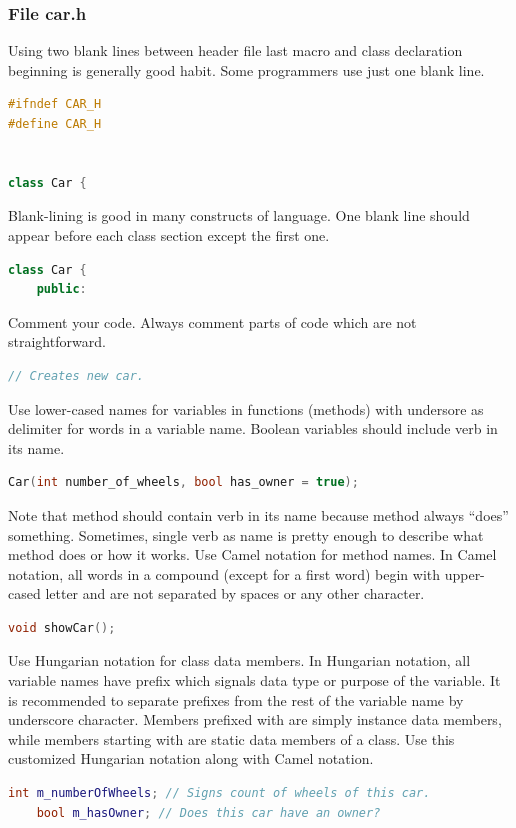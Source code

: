 \subsubsection*{File car.h}
Using two blank lines between header file last macro and class declaration beginning is generally good habit. Some programmers use just one blank line.
\begin{lstlisting}[firstnumber=1,language=cpp]
#ifndef CAR_H
#define CAR_H


class Car {
\end{lstlisting}
Blank-lining is good in many constructs of \cpp{} language. One blank line should appear before each class section except the first one.
\begin{lstlisting}[firstnumber=5,language=cpp]
class Car {
    public:
\end{lstlisting}
Comment your code. Always comment parts of code which are not straightforward.
\begin{lstlisting}[firstnumber=7,language=cpp]
	// Creates new car.
\end{lstlisting}
Use lower-cased names for variables in functions (methods) with undersore as delimiter for words in a variable name. Boolean variables should include verb in its name.
\begin{lstlisting}[firstnumber=8,language=cpp]
	Car(int number_of_wheels, bool has_owner = true);
\end{lstlisting}
Note that method should contain verb in its name because method always \enquote{does} something. Sometimes, single verb as name is pretty enough to describe what method does or how it works. Use Camel notation for method names. In Camel notation, all words in a compound (except for a first word) begin with upper-cased letter and are not separated by spaces or any other character.
\begin{lstlisting}[firstnumber=11,language=cpp]
	void showCar();
\end{lstlisting}
Use Hungarian notation for class data members. In Hungarian notation, all variable names have prefix which signals data type or purpose of the variable. It is recommended to separate prefixes from the rest of the variable name by underscore character. Members prefixed with are simply instance data members, while members starting with are static data members of a class. Use this customized Hungarian notation along with Camel notation.
\begin{lstlisting}[firstnumber=14,language=cpp]
	int m_numberOfWheels; // Signs count of wheels of this car.
	bool m_hasOwner; // Does this car have an owner?
\end{lstlisting}

